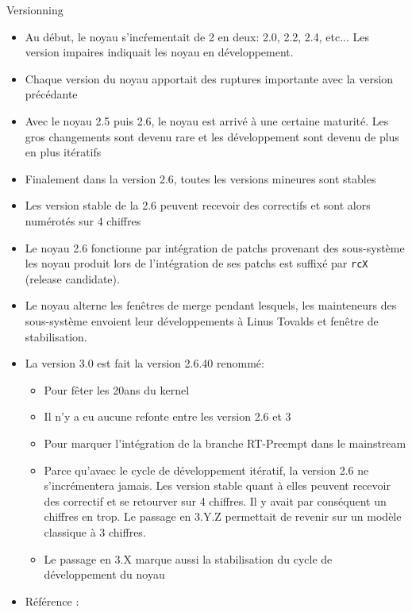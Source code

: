 \begin{frame}[fragile=singleslide]{Versionning}
  \begin{itemize}
  \item Au début, le noyau s'incŕementait de 2 en deux: 2.0, 2.2, 2.4,
    etc... Les version impaires indiquait les noyau en développement.
  \item Chaque version du noyau apportait des ruptures importante avec
    la version précédante
  \item Avec le noyau 2.5 puis 2.6, le noyau est arrivé à une certaine
    maturité.   Les  gros   changements  sont   devenu  rare   et  les
    développement sont devenu de plus en plus itératifs
  \item Finalement  dans la version 2.6, toutes  les versions mineures
    sont stables
  \item Les version  stable de la 2.6 peuvent  recevoir des correctifs
    et sont alors numérotés sur 4 chiffres
  \item Le  noyau 2.6 fonctionne  par intégration de  patchs provenant
    des sous-système  les noyau produit  lors de l'intégration  de ses
    patchs est suffixé par \texttt{rcX} (release candidate).
  \item Le noyau  alterne les fenêtres de merge  pendant lesquels, les
    mainteneurs des sous-système  envoient leur développements à Linus
    Tovalds et fenêtre de stabilisation.
  \item La version 3.0 est fait la version 2.6.40 renommé:
    \begin{itemize}
    \item Pour fêter les 20ans du kernel
    \item Il n'y a eu aucune refonte entre les version 2.6 et 3
    \item Pour marquer l'intégration  de la branche RT-Preempt dans le
      mainstream
    \item  Parce  qu'avaec  le  cycle de  développement  itératif,  la
      version 2.6 ne s'incrémentera jamais. Les version stable quant à
      elles  peuvent recevoir  des  correctif et  se  retourver sur  4
      chiffres.  Il y  avait par  conséquent un  chiffres en  trop. Le
      passage en 3.Y.Z permettait de revenir sur un modèle classique à
      3 chiffres.
    \item Le passage en 3.X  marque aussi la stabilisation du cycle de
      développement du noyau
    \end{itemize} 
  \item Référence : 
  \end{itemize} 
\end{frame} 

